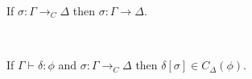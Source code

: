 \begin{prop}
If $\sigma : \Gamma \rightarrow_C \Delta$ then $\sigma : \Gamma \rightarrow \Delta$.
\end{prop}

\begin{code}%
\> \AgdaSymbol{:}  \AgdaSymbol{\{} \AgdaSymbol{\}} \AgdaSymbol{\{} \AgdaSymbol{:}   \AgdaSymbol{\}} \AgdaSymbol{\{} \AgdaSymbol{\}}            \<%
\\
\>   \AgdaSymbol{=}  \AgdaSymbol{(} \AgdaSymbol{)}\<%
\end{code}

\begin{prop}
If $\Gamma \vdash \delta : \phi$ and $\sigma : \Gamma \rightarrow_C \Delta$ then $\delta [ \sigma ] \in C_\Delta(\phi)$.
\end{prop}

